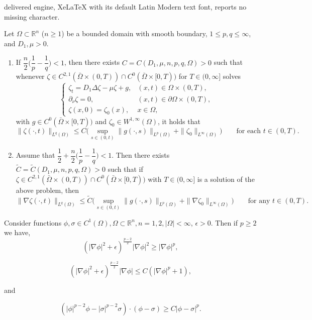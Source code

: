 \documentclass[10pt,a4paper]{amsart}
\begin{document}
delivered engine, XeLaTeX with its default Latin Modern text font, reports no missing character.
\begin{lemma}\label{lem:2.1prime}
Let $\Omega\subset\mathbb{R}^n$ ($n\ge 1$) be a bounded domain with smooth boundary, $1\le p,q\le\infty$, and $D_1,\mu>0$.

\begin{enumerate}
\item[(i)] If $\dfrac{n}{2}\Big(\dfrac1p-\dfrac1q\Big)<1$, then there exists $C=C(D_1,\mu,n,p,q,\Omega)>0$ such that whenever
$\zeta\in C^{2,1}(\bar\Omega\times(0,T))\cap C^0(\bar\Omega\times[0,T))$ for $T\in(0,\infty]$ solves
\[
\begin{cases}
\zeta_t=D_1\Delta\zeta-\mu\zeta+g, & (x,t)\in\Omega\times(0,T),\\
\partial_\nu\zeta=0, & (x,t)\in\partial\Omega\times(0,T),\\
\zeta(x,0)=\zeta_0(x), & x\in\Omega,
\end{cases}
\]
with $g\in C^0(\bar\Omega\times[0,T))$ and $\zeta_0\in W^{1,\infty}(\Omega)$, it holds that
\[
\|\zeta(\cdot,t)\|_{L^q(\Omega)} \le C\Big(\sup_{s\in(0,t)}\|g(\cdot,s)\|_{L^p(\Omega)}+\|\zeta_0\|_{L^\infty(\Omega)}\Big)
\qquad\text{for each } t\in(0,T).
\]

\item[(ii)] Assume that $\dfrac12+\dfrac{n}{2}\Big(\dfrac1p-\dfrac1q\Big)<1$. Then there exists $\tilde C=\tilde C(D_1,\mu,n,p,q,\Omega)>0$ such that if
$\zeta\in C^{2,1}(\bar\Omega\times(0,T))\cap C^0(\bar\Omega\times[0,T))$ with $T\in(0,\infty]$ is a solution of the above problem, then
\[
\|\nabla\zeta(\cdot,t)\|_{L^q(\Omega)} \le \tilde C\Big(\sup_{s\in(0,t)}\|g(\cdot,s)\|_{L^p(\Omega)}+\|\nabla\zeta_0\|_{L^\infty(\Omega)}\Big)
\qquad\text{for any } t\in(0,T).
\]
\end{enumerate}
\end{lemma}

\begin{lemma}
\label{lem:pc1}
    Consider functions $\phi, \sigma \in C^{1}(\Omega), \Omega \subset \mathbb{R}^{n}, n=1,2, |\Omega| < \infty$, $\epsilon > 0$. Then if $p \geq 2$ we have,
    \begin{equation}
        (|\nabla \phi|^{2} + \epsilon)^{\frac{p-2}{2}}|\nabla \phi|^{2} \geq |\nabla \phi|^{p},
\end{equation}


\begin{equation}
        (|\nabla \phi|^{2} + \epsilon)^{\frac{p-2}{2}}|\nabla \phi| \leq C\left(|\nabla \phi|^{p}+1\right),
\end{equation}

and 

\begin{equation}
        (|\phi|^{p-2}\phi - |\sigma|^{p-2}\sigma)\cdot (\phi - \sigma) \geq C |\phi - \sigma|^{p}.
\end{equation}

\end{lemma}
\end{document}
